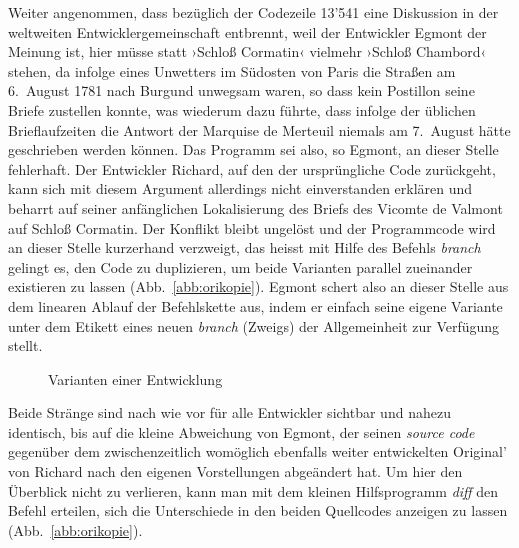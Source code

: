 \documentclass[a4paper,10pt]{article}
\newcommand{\inanf}[1]{›#1‹}
\begin{document}
Weiter angenommen, dass bezüglich der Codezeile 13'541 eine Diskussion in der weltweiten Entwicklergemeinschaft entbrennt, weil der Entwickler {\color{hokkaido}Egmont} der Meinung ist, hier müsse statt \inanf{Schloß Cormatin} vielmehr \inanf{Schloß Chambord} stehen, da infolge eines Unwetters im Südosten von Paris die Straßen am 6.~August 1781 nach Burgund unwegsam waren, so dass kein Postillon seine Briefe zustellen konnte, was wiederum dazu führte, dass infolge der üblichen Brieflaufzeiten die Antwort der Marquise de Merteuil niemals am 7.~August hätte geschrieben werden können. Das Programm sei also, so {\color{hokkaido}Egmont}, an dieser Stelle fehlerhaft. Der Entwickler {\color{dzug}Richard}, auf den der ursprüngliche Code zurückgeht, kann sich mit diesem Argument allerdings nicht einverstanden erklären und beharrt auf seiner anfänglichen Lokalisierung des Briefs des Vicomte de Valmont auf Schloß Cormatin. Der Konflikt bleibt ungelöst und der Programmcode wird an dieser Stelle kurzerhand verzweigt, das heisst mit Hilfe des Befehls \emph{branch} gelingt es, den Code zu duplizieren, um beide Varianten parallel zueinander existieren zu lassen (Abb.~\ref{abb:orikopie}). {\color{hokkaido}Egmont} schert also an dieser Stelle aus dem linearen Ablauf der Befehlskette aus, indem er einfach seine eigene Variante unter dem Etikett eines neuen \emph{branch} (Zweigs) der Allgemeinheit zur Verfügung stellt.

\begin{figure}[ht]
\begin{center}


\end{center}
\caption{Varianten einer Entwicklung}\label{flowgen}
\end{figure}

Beide Stränge sind nach wie vor für alle Entwickler sichtbar und nahezu identisch, bis auf die kleine Abweichung von {\color{hokkaido}Egmont}, der seinen \emph{source code} gegenüber dem zwischenzeitlich womöglich ebenfalls weiter entwickelten Original' von {\color{dzug}Richard} nach den eigenen Vorstellungen abgeändert hat. Um hier den Überblick nicht zu verlieren, kann man mit dem kleinen Hilfsprogramm \emph{diff} den Befehl erteilen, sich die Unterschiede in den beiden Quellcodes anzeigen zu lassen (Abb.~\ref{abb:orikopie}).
\end{document}
